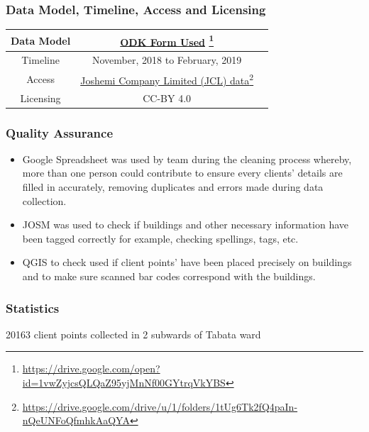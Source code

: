 \documentclass[a4paper,12pt,twoside]{article}
\begin{document}
\subsubsection{Data Model, Timeline, Access and Licensing}
\begin{center}
\begin{tabular}{|c|c|c|}  
 \hline
Data Model &
      \href{https://drive.google.com/open?id=1vwZyjcsQLQaZ95yjMnNf00GYtrqVkYBS}{ODK Form Used} \footnote{\url{https://drive.google.com/open?id=1vwZyjcsQLQaZ95yjMnNf00GYtrqVkYBS}} \\
 \hline
  Timeline  &  November, 2018 to February, 2019 \\
\hline  
 Access  & 
   \href{https://drive.google.com/drive/u/1/folders/1tUg6Tk2fQ4paIn-nQeUNFoQfmhkAaQYA}{Joshemi Company Limited (JCL) data}\footnote{\url{https://drive.google.com/drive/u/1/folders/1tUg6Tk2fQ4paIn-nQeUNFoQfmhkAaQYA}} \\
   
\hline 
    Licensing & CC-BY 4.0 \\
\hline
\end{tabular}
\end{center}

\newpage

\subsubsection{Quality Assurance}
\begin{itemize}
    \item Google Spreadsheet was used by team during the cleaning process whereby, more than one person could contribute to ensure every clients’ details are filled in accurately, removing duplicates and errors made during data collection.
    \item JOSM was used to check if buildings and other necessary information have been tagged correctly for example, checking spellings, tags, etc.
    \item QGIS to check used if client points' have been placed precisely on buildings and to make sure scanned bar codes correspond with the buildings.
\end{itemize}

\subsubsection{Statistics}
20163 client points collected in 2 subwards of Tabata ward
\end{document}
